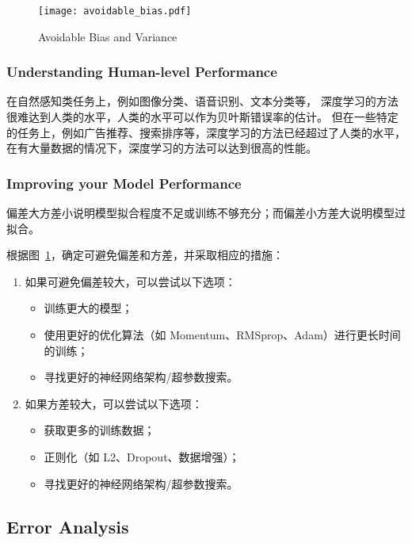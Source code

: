 \begin{figure}[h!bt]
    \centering
    \texttt{[image: avoidable\_bias.pdf]}
    \caption{Avoidable Bias and Variance}
    \label{fig:avoidable_bias}
\end{figure}

\subsubsection{Understanding Human-level Performance}

在自然感知类任务上，例如图像分类、语音识别、文本分类等，
深度学习的方法很难达到人类的水平，人类的水平可以作为贝叶斯错误率的估计。
但在一些特定的任务上，例如广告推荐、搜索排序等，深度学习的方法已经超过了人类的水平，
在有大量数据的情况下，深度学习的方法可以达到很高的性能。

\subsubsection{Improving your Model Performance}

偏差大方差小说明模型拟合程度不足或训练不够充分；而偏差小方差大说明模型过拟合。

根据图~\ref{fig:avoidable_bias}，确定可避免偏差和方差，并采取相应的措施：

\begin{enumerate}
    \item 如果可避免偏差较大，可以尝试以下选项：
        \begin{itemize}
            \item 训练更大的模型；
            \item 使用更好的优化算法（如 Momentum、RMSprop、Adam）进行更长时间的训练；
            \item 寻找更好的神经网络架构/超参数搜索。
        \end{itemize}
    \item 如果方差较大，可以尝试以下选项：
        \begin{itemize}
            \item 获取更多的训练数据；
            \item 正则化（如 L2、Dropout、数据增强）；
            \item 寻找更好的神经网络架构/超参数搜索。
        \end{itemize}
\end{enumerate}

\subsection{Error Analysis}

